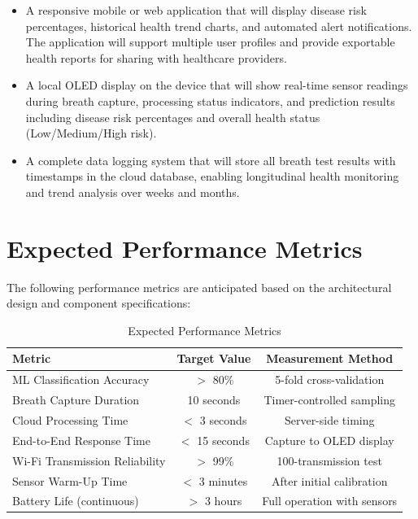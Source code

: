\begin{itemize}[leftmargin=1.5cm]
\item A responsive mobile or web application that will display disease risk percentages, historical health trend charts, and automated alert notifications. The application will support multiple user profiles and provide exportable health reports for sharing with healthcare providers.

\item A local OLED display on the device that will show real-time sensor readings during breath capture, processing status indicators, and prediction results including disease risk percentages and overall health status (Low/Medium/High risk).

\item A complete data logging system that will store all breath test results with timestamps in the cloud database, enabling longitudinal health monitoring and trend analysis over weeks and months.
\end{itemize}

\section{Expected Performance Metrics}
The following performance metrics are anticipated based on the architectural design and component specifications:

\begin{table}[h]
\centering
\begin{tabular}{|l|c|c|}
\hline
\textbf{Metric} & \textbf{Target Value} & \textbf{Measurement Method} \\
\hline
ML Classification Accuracy & $>$ 80\% & 5-fold cross-validation \\
\hline
Breath Capture Duration & 10 seconds & Timer-controlled sampling \\
\hline
Cloud Processing Time & $<$ 3 seconds & Server-side timing \\
\hline
End-to-End Response Time & $<$ 15 seconds & Capture to OLED display \\
\hline
Wi-Fi Transmission Reliability & $>$ 99\% & 100-transmission test \\
\hline
Sensor Warm-Up Time & $<$ 3 minutes & After initial calibration \\
\hline
Battery Life (continuous) & $>$ 3 hours & Full operation with sensors \\
\hline
\end{tabular}
\caption{Expected Performance Metrics}
\end{table}


